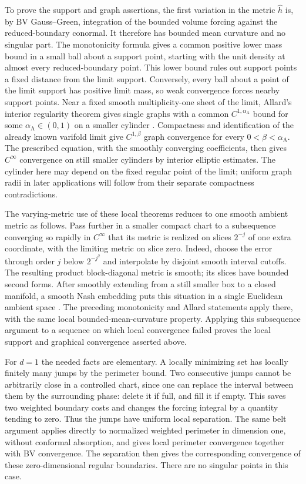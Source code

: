 To prove the support and graph assertions, the first variation in
the metric $\widehat h$ is, by BV Gauss--Green, integration of the bounded
volume forcing against the reduced-boundary conormal.  It therefore has
bounded mean curvature and no singular part.  The monotonicity formula
gives a common positive lower mass bound in a small ball about a support
point, starting with the unit density at almost every reduced-boundary
point.  This lower bound rules out support points a fixed distance from
the limit support.  Conversely, every ball about a point of the limit
support has positive limit mass, so weak convergence forces nearby
support points.  Near a fixed smooth multiplicity-one sheet of the
limit, Allard's interior regularity theorem gives single graphs with a
common $C^{1,\alpha_{\mathrm A}}$ bound for some
$\alpha_{\mathrm A}\in(0,1)$ on a smaller cylinder \cite{Allard1972}.
Compactness and identification of the already known varifold limit give
$C^{1,\beta}$ graph convergence for every $0<\beta<\alpha_{\mathrm A}$.
The prescribed equation, with the smoothly converging coefficients,
then gives $C^\infty$ convergence on still smaller cylinders by
interior elliptic estimates.  The cylinder here may depend on the fixed
regular point of the limit; uniform graph radii in later applications
will follow from their separate compactness contradictions.

The varying-metric use of these local theorems reduces to one smooth
ambient metric as follows.  Pass further in a smaller compact chart to a subsequence converging so
rapidly in $C^\infty$ that its metric is realized on slices $2^{-j}$ of
one extra coordinate, with the limiting metric on slice zero.  Indeed,
choose the error through order $j$ below $2^{-j^2}$ and interpolate by
disjoint smooth interval cutoffs.  The resulting product block-diagonal
metric is smooth; its slices have bounded second forms.  After smoothly
extending from a still smaller box to a closed manifold, a smooth Nash
embedding puts this situation in a single Euclidean ambient space
\cite[Theorem~2, p.~59]{Nash1956}.
The preceding monotonicity and Allard statements apply there, with the
same local bounded-mean-curvature property.  Applying this subsequence
argument to a sequence on which local convergence failed proves the
local support and graphical convergence asserted above.

For $d=1$ the needed facts are elementary.  A locally minimizing set has
locally finitely many jumps by the perimeter bound.  Two consecutive
jumps cannot be arbitrarily close in a controlled chart, since one can
replace the interval between them by the surrounding phase: delete it if
full, and fill it if empty.  This saves two weighted boundary costs
and changes the forcing integral by a quantity tending to zero.  Thus
the jumps have uniform local separation.  The same belt argument applies
directly to normalized weighted perimeter in dimension one, without
conformal absorption, and gives local perimeter convergence together
with BV convergence.  The separation then gives the corresponding
convergence of these zero-dimensional regular boundaries.  There are no
singular points in this case.

